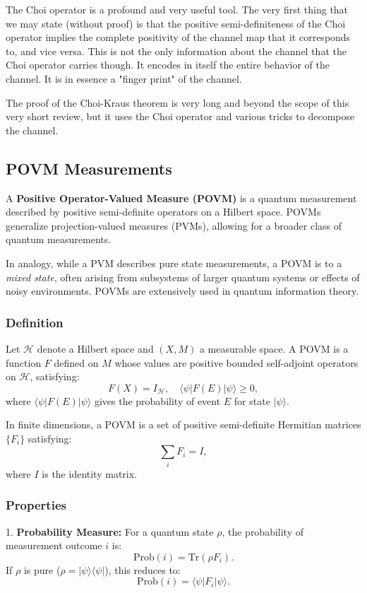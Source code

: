 The Choi operator is a profound and very useful tool. The very first thing that we may state
(without proof) is that the positive semi-definiteness of the Choi operator implies the 
complete positivity of the channel map that it corresponds to, and vice versa. This is not
the only information about the channel that the Choi operator carries though. It encodes in
itself the entire behavior of the channel. It is in essence a "finger print" of the channel.

The proof of the Choi-Kraus theorem is very long and beyond the scope of this very short review,
but it uses the Choi operator and various tricks to decompose the channel.

\renewcommand{\pageauthor}{Yash Seri}

\subsection{POVM Measurements}
A \textbf{Positive Operator-Valued Measure (POVM)} is a quantum measurement described by positive semi-definite operators on a Hilbert space. POVMs generalize projection-valued measures (PVMs), allowing for a broader class of quantum measurements. 

In analogy, while a PVM describes pure state measurements, a POVM is to a \emph{mixed state}, often arising from subsystems of larger quantum systems or effects of noisy environments. POVMs are extensively used in quantum information theory.

\subsubsection{Definition}
Let \( \mathcal{H} \) denote a Hilbert space and \( (X, M) \) a measurable space. A POVM is a function \( F \) defined on \( M \) whose values are positive bounded self-adjoint operators on \( \mathcal{H} \), satisfying:
\[
F(X) = I_{\mathcal{H}}, \quad \langle \psi | F(E) | \psi \rangle \geq 0,
\]
where \( \langle \psi | F(E) | \psi \rangle \) gives the probability of event \( E \) for state \( |\psi\rangle \). 

In finite dimensions, a POVM is a set of positive semi-definite Hermitian matrices \( \{F_i\} \) satisfying:
\[
\sum_i F_i = I,
\]
where \( I \) is the identity matrix.

\subsubsection{Properties}
1. \textbf{Probability Measure:} For a quantum state \( \rho \), the probability of measurement outcome \( i \) is:
   \[
   \text{Prob}(i) = \text{Tr}(\rho F_i).
   \]
   If \( \rho \) is pure (\( \rho = |\psi\rangle\langle\psi| \)), this reduces to:
   \[
   \text{Prob}(i) = \langle \psi | F_i | \psi \rangle.
   \]

